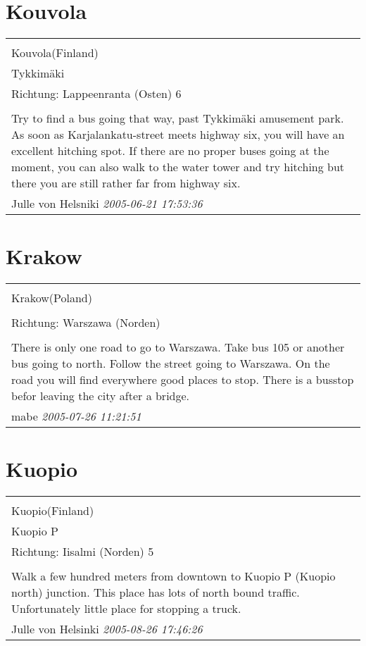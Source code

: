 \documentclass[a4paper,12pt]{article}
\begin{document}
\section{Kouvola}
\begin{tabular}{|p{13cm}|}
\hline\\
Kouvola(Finland)\\
Tykkimäki\\
Richtung: Lappeenranta (Osten) 6 \\
\hline\\
Try to find a bus going that way, past Tykkimäki amusement park. As soon as Karjalankatu-street meets highway six, you will have an excellent hitching spot. If there are no proper buses going at the moment, you can also walk to the water tower and try hitching but there you are still rather far from highway six. \\
Julle von Helsniki \textit{ 2005-06-21 17:53:36 }\\\hline
\end{tabular}


\section{Krakow}
\begin{tabular}{|p{13cm}|}
\hline\\
Krakow(Poland)\\
\\
Richtung: Warszawa (Norden) \\
\hline\\
There is only one road to go to Warszawa. Take bus 105 or another bus going to north. Follow the street going to Warszawa. On the road you will find everywhere good places to stop. There is a busstop befor leaving the city after a bridge. \\
mabe \textit{ 2005-07-26 11:21:51 }\\\hline
\end{tabular}


\section{Kuopio}
\begin{tabular}{|p{13cm}|}
\hline\\
Kuopio(Finland)\\
Kuopio P\\
Richtung: Iisalmi (Norden) 5 \\
\hline\\
Walk a few hundred meters from downtown to Kuopio P (Kuopio north) junction. This place has lots of north bound traffic. Unfortunately little place for stopping a truck. \\
Julle von Helsinki \textit{ 2005-08-26 17:46:26 }\\\hline
\end{tabular}
\end{document}
